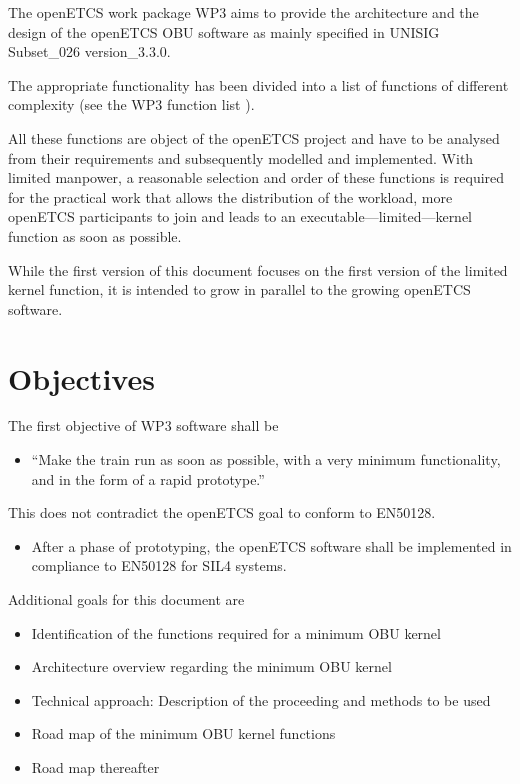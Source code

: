 \documentclass{template/openetcs_report}
\begin{document}
The openETCS work package WP3 aims to provide the architecture and the design of the openETCS OBU software as mainly specified in \cite{subset-026} UNISIG Subset\_026 version\_3.3.0. 

The appropriate functionality has been divided into a list of functions of different complexity (see the WP3 function list \cite{functions}).

All these functions are object of the openETCS project and have to be analysed from their requirements and subsequently modelled and implemented. With limited manpower, a reasonable selection and order of these functions is required for the practical work that allows the distribution of the workload, more openETCS participants to join and leads to an executable---limited---kernel function as soon as possible. 

While the first version of this document focuses on the first version of the limited kernel function, it is intended to grow in parallel to the growing openETCS software.


\section{Objectives}
\label{sec:Objectives}



The first objective of WP3 software shall be
\begin{itemize}
	\item ``Make the train run as soon as possible, with a very minimum functionality, and in the form of a rapid prototype.''
\end{itemize}
This does not contradict the openETCS goal to conform to EN50128.
\begin{itemize}
	\item After a phase of prototyping, the openETCS software shall be implemented in compliance to EN50128 for SIL4 systems.
\end{itemize}
Additional goals for this document are
\begin{itemize}
	\item Identification of the functions required for a minimum OBU kernel
	\item Architecture overview regarding the minimum OBU kernel
	\item Technical approach: Description of the proceeding and methods to be used
	\item Road map of the minimum OBU kernel functions
	\item Road map thereafter
\end{itemize}
\end{document}
